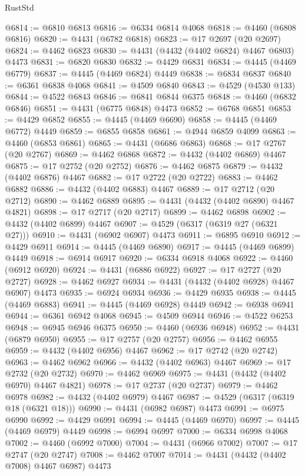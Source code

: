 \begin{lexlean}{RustStd}
\begin{coremodule}
@6814 := @6810 @6813
@6816 := @6334 @6814 @4068
@6818 := @4460 (@6808 @6816)
@6820 := @4431 (@6782 @6818)
@6823 := @17 @2697 (@20 @2697)
@6824 := @4462 @6823
@6830 := @4431 (@4432 (@4402 @6824) @4467 @6803) @4473
@6831 := @6820 @6830
@6832 := @4429 @6831
@6834 := @4445 (@4469 @6779)
@6837 := @4445 (@4469 @6824) @4449
@6838 := @6834 @6837
@6840 := @6361 @6838 @4068
@6841 := @4509 @6840
@6843 := @4529 (@4530 @133)
@6844 := @4522 @6843
@6846 := @6841 @6844 @6375
@6848 := @4460 (@6832 @6846)
@6851 := @4431 (@6775 @6848) @4473
@6852 := @6768 @6851
@6853 := @4429 @6852
@6855 := @4445 (@4469 @6690)
@6858 := @4445 (@4469 @6772) @4449
@6859 := @6855 @6858
@6861 := @4944 @6859 @4099
@6863 := @4460 (@6853 @6861)
@6865 := @4431 (@6686 @6863)
@6868 := @17 @2767 (@20 @2767)
@6869 := @4462 @6868
@6872 := @4432 (@4402 @6869) @4467
@6875 := @17 @2752 (@20 @2752)
@6876 := @4462 @6875
@6879 := @4432 (@4402 @6876) @4467
@6882 := @17 @2722 (@20 @2722)
@6883 := @4462 @6882
@6886 := @4432 (@4402 @6883) @4467
@6889 := @17 @2712 (@20 @2712)
@6890 := @4462 @6889
@6895 := @4431 (@4432 (@4402 @6890) @4467 @4821)
@6898 := @17 @2717 (@20 @2717)
@6899 := @4462 @6898
@6902 := @4432 (@4402 @6899) @4467
@6907 := @4529 (@6317 (@6319 @27 (@6321 @27)))
@6910 := @4431 (@6902 @6907) @4473
@6911 := @6895 @6910
@6912 := @4429 @6911
@6914 := @4445 (@4469 @6890)
@6917 := @4445 (@4469 @6899) @4449
@6918 := @6914 @6917
@6920 := @6334 @6918 @4068
@6922 := @4460 (@6912 @6920)
@6924 := @4431 (@6886 @6922)
@6927 := @17 @2727 (@20 @2727)
@6928 := @4462 @6927
@6934 := @4431 (@4432 (@4402 @6928) @4467 @6907) @4473
@6935 := @6924 @6934
@6936 := @4429 @6935
@6938 := @4445 (@4469 @6883)
@6941 := @4445 (@4469 @6928) @4449
@6942 := @6938 @6941
@6944 := @6361 @6942 @4068
@6945 := @4509 @6944
@6946 := @4522 @6253
@6948 := @6945 @6946 @6375
@6950 := @4460 (@6936 @6948)
@6952 := @4431 (@6879 @6950)
@6955 := @17 @2757 (@20 @2757)
@6956 := @4462 @6955
@6959 := @4432 (@4402 @6956) @4467
@6962 := @17 @2742 (@20 @2742)
@6963 := @4462 @6962
@6966 := @4432 (@4402 @6963) @4467
@6969 := @17 @2732 (@20 @2732)
@6970 := @4462 @6969
@6975 := @4431 (@4432 (@4402 @6970) @4467 @4821)
@6978 := @17 @2737 (@20 @2737)
@6979 := @4462 @6978
@6982 := @4432 (@4402 @6979) @4467
@6987 := @4529 (@6317 (@6319 @18 (@6321 @18)))
@6990 := @4431 (@6982 @6987) @4473
@6991 := @6975 @6990
@6992 := @4429 @6991
@6994 := @4445 (@4469 @6970)
@6997 := @4445 (@4469 @6979) @4449
@6998 := @6994 @6997
@7000 := @6334 @6998 @4068
@7002 := @4460 (@6992 @7000)
@7004 := @4431 (@6966 @7002)
@7007 := @17 @2747 (@20 @2747)
@7008 := @4462 @7007
@7014 := @4431 (@4432 (@4402 @7008) @4467 @6987) @4473

\end{coremodule}
\end{lexlean}
